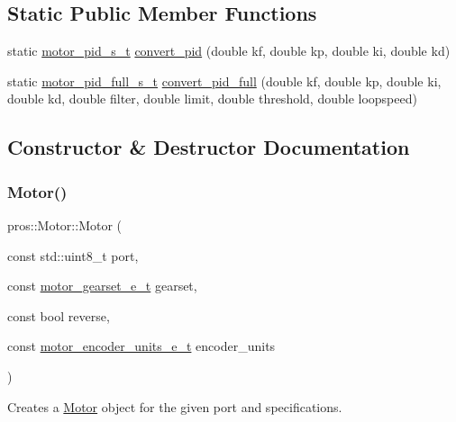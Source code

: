 \subsection*{Static Public Member Functions}
\begin{DoxyCompactItemize}
\item 
static \hyperlink{motors_8h_ad2e907c8d7ce53c1fd91f1b9801072e3}{motor\+\_\+pid\+\_\+s\+\_\+t} \hyperlink{classpros_1_1Motor_adca7af38b0357c254e81ed882a2283a0}{convert\+\_\+pid} (double kf, double kp, double ki, double kd)
\item 
static \hyperlink{motors_8h_a0295cbf49f5c70c17b5fa962bd25febd}{motor\+\_\+pid\+\_\+full\+\_\+s\+\_\+t} \hyperlink{classpros_1_1Motor_a2d8c9c462e47e989ebe64fa341be91c6}{convert\+\_\+pid\+\_\+full} (double kf, double kp, double ki, double kd, double filter, double limit, double threshold, double loopspeed)
\end{DoxyCompactItemize}


\subsection{Constructor \& Destructor Documentation}
\mbox{\label{classpros_1_1Motor_a5be9a41f9877208c887d5e2c081bc72e}} 
\subsubsection{\texorpdfstring{Motor()}{Motor()}\hspace{0.1cm}{\footnotesize\ttfamily [1/5]}}
{\footnotesize\ttfamily pros\+::\+Motor\+::\+Motor (\begin{DoxyParamCaption}\item[{const std\+::uint8\+\_\+t}]{port,  }\item[{const \hyperlink{motors_8h_aa2f1c305c998abc3bf8dd1f76fa4da8b}{motor\+\_\+gearset\+\_\+e\+\_\+t}}]{gearset,  }\item[{const bool}]{reverse,  }\item[{const \hyperlink{motors_8h_a6677ba23760c558fd8b7b4e1e00a6123}{motor\+\_\+encoder\+\_\+units\+\_\+e\+\_\+t}}]{encoder\+\_\+units }\end{DoxyParamCaption})\hspace{0.3cm}{\ttfamily [explicit]}}

Creates a \hyperlink{classpros_1_1Motor}{Motor} object for the given port and specifications.

